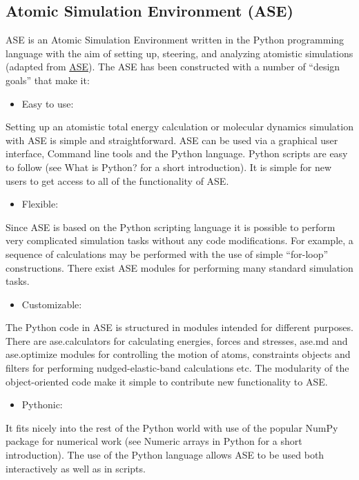 \documentclass[11pt]{article}
\begin{document}
\subsection{Atomic Simulation Environment (ASE)}
\label{sec-2-3}
ASE is an Atomic Simulation Environment written in the Python programming language with the aim of setting up, steering, and analyzing atomistic simulations (adapted from \href{https://wiki.fysik.dtu.dk/ase/about.html}{ASE}). The ASE has been constructed with a number of “design goals” that make it:

\begin{itemize}
\item Easy to use:
\end{itemize}
Setting up an atomistic total energy calculation or molecular dynamics simulation with ASE is simple and straightforward. ASE can be used via a graphical user interface, Command line tools and the Python language. Python scripts are easy to follow (see What is Python? for a short introduction). It is simple for new users to get access to all of the functionality of ASE.

\begin{itemize}
\item Flexible:
\end{itemize}
Since ASE is based on the Python scripting language it is possible to perform very complicated simulation tasks without any code modifications. For example, a sequence of calculations may be performed with the use of simple “for-loop” constructions. There exist ASE modules for performing many standard simulation tasks.

\begin{itemize}
\item Customizable:
\end{itemize}
The Python code in ASE is structured in modules intended for different purposes. There are ase.calculators for calculating energies, forces and stresses, ase.md and ase.optimize modules for controlling the motion of atoms, constraints objects and filters for performing nudged-elastic-band calculations etc. The modularity of the object-oriented code make it simple to contribute new functionality to ASE.

\begin{itemize}
\item Pythonic:
\end{itemize}
It fits nicely into the rest of the Python world with use of the popular NumPy package for numerical work (see Numeric arrays in Python for a short introduction). The use of the Python language allows ASE to be used both interactively as well as in scripts.
\end{document}
